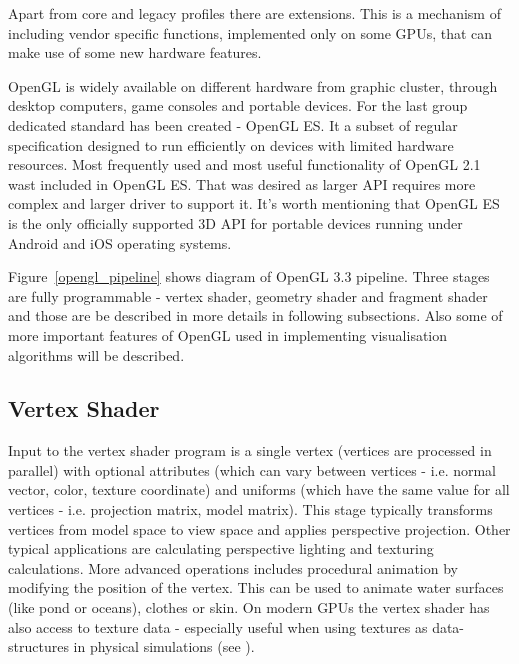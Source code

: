 Apart from core and legacy profiles there are extensions. This is a mechanism of including vendor specific functions, implemented only on some GPUs, that can make use of some new hardware features. 

OpenGL is widely available on different hardware from graphic cluster, through desktop computers, game consoles and portable devices. For the last group dedicated standard has been created - OpenGL ES. It a subset of regular specification designed to run efficiently on devices with limited hardware resources. Most frequently used and most useful functionality of OpenGL 2.1 wast included in OpenGL ES. That was desired as larger API requires more complex and larger driver to support it. It's worth mentioning that OpenGL ES is the only officially supported 3D API for portable devices running under Android and iOS operating systems. 


Figure~\ref{opengl_pipeline} shows diagram of OpenGL 3.3 pipeline. Three stages are fully programmable - vertex shader, geometry shader and fragment shader and those are be described in more details in following subsections. Also some of more important features of OpenGL used in implementing visualisation algorithms will be described.

\subsection{Vertex Shader}
Input to the vertex shader program is a single vertex (vertices are processed in parallel) with optional attributes (which can vary between vertices - i.e.  normal vector, color, texture coordinate) and uniforms (which have the same value for all vertices - i.e. projection matrix, model matrix). This stage typically transforms vertices from model space to view space and applies perspective projection. Other typical applications are calculating perspective lighting and texturing calculations. More advanced operations includes procedural animation by modifying the position of the vertex. This can be used to animate water surfaces (like pond or oceans), clothes or skin. On modern GPUs the vertex shader has also access to texture data - especially useful when using textures as data-structures in physical simulations (see \cite[pages~412-419]{OpenGLSuperbible}).

